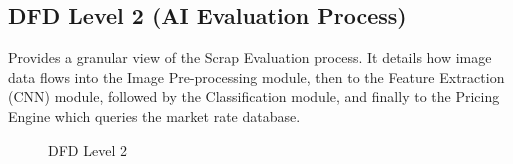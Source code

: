 \subsection{DFD Level 2 (AI Evaluation Process)}
Provides a granular view of the Scrap Evaluation process. It details how image data flows into the Image Pre-processing module, then to the Feature Extraction (CNN) module, followed by the Classification module, and finally to the Pricing Engine which queries the market rate database.
\begin{figure}[H]
    \centering
    \vspace{5cm}
    \caption{DFD Level 2}
    \label{fig:dfd_2}
\end{figure}
